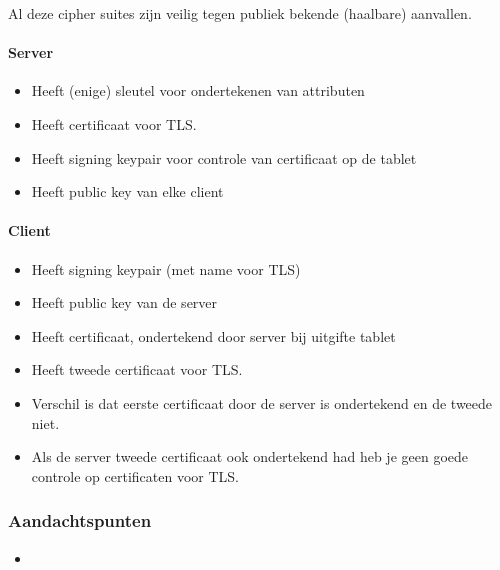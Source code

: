 Al deze cipher suites zijn veilig tegen publiek bekende (haalbare) aanvallen.


\paragraph{Server}
\begin{itemize}
	\item Heeft (enige) sleutel voor ondertekenen van attributen
  \item Heeft certificaat voor TLS.
  \item Heeft signing keypair voor controle van certificaat op de tablet
  \item Heeft public key van elke client
\end{itemize}

\paragraph{Client}
\begin{itemize}
	\item Heeft signing keypair (met name voor TLS)
  \item Heeft public key van de server
  \item Heeft certificaat, ondertekend door server bij uitgifte tablet
  \item Heeft tweede certificaat voor TLS.
  \item Verschil is dat eerste certificaat door de server is ondertekend en de tweede niet.
  \item Als de server tweede certificaat ook ondertekend had heb je geen goede controle op certificaten voor TLS.
\end{itemize}

\subsubsection{Aandachtspunten}
\begin{itemize}
  \item 
\end{itemize}


